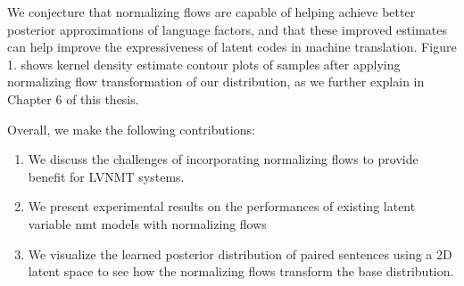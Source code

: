 We conjecture that normalizing flows are capable of helping achieve better posterior approximations of language factors, and that these improved estimates can help improve the expressiveness of latent codes in machine translation. Figure 1. shows kernel density estimate contour plots of samples after applying normalizing flow transformation
of our distribution, as we further explain in Chapter 6 of this thesis.



Overall, we make the following contributions:
\begin{enumerate}
	\item We discuss the challenges of incorporating normalizing flows to provide benefit for LVNMT systems. 
	
	\item We present experimental results on the performances of existing latent variable nmt models with normalizing flows
	
	\item We visualize the learned posterior distribution of paired sentences using a 2D latent space to see how the normalizing flows transform the base distribution.
\end{enumerate}

